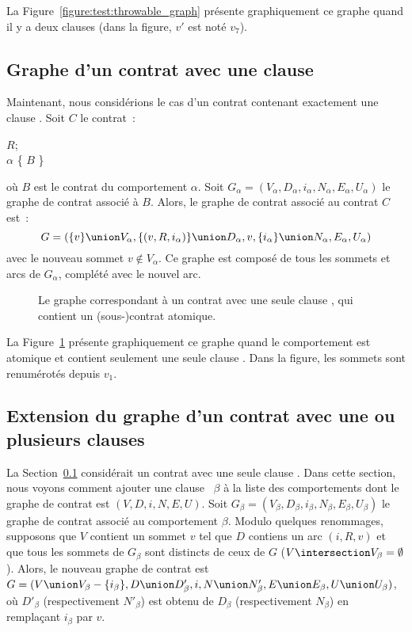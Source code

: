La Figure~\ref{figure:test:throwable_graph} présente graphiquement ce graphe
quand il y a deux clauses \athrowable (dans la figure, $v'$ est noté $v_7$).

\subsection{Graphe d'un contrat avec une clause \abehavior}
\label{subsection:test:behavior_graph}

Maintenant, nous considérions le cas d'un contrat contenant exactement une
clause \abehavior. Soit $C$ le contrat~:
%
\begin{pre}
\arequires \(R\); \\
\abehavior \(\alpha\) \{ \(B\) \}
\end{pre}
%
où $B$ est le contrat du comportement $\alpha$. Soit $G_\alpha = (V_\alpha,
D_\alpha, i_\alpha, N_\alpha, E_\alpha, U_\alpha)$ le graphe de contrat associé
à $B$. Alors, le graphe de contrat associé au contrat $C$ est~:
%
$$G = (
  \{v\} \union V_\alpha,
  \{(v, R, i_\alpha)\} \union D_\alpha,
  v,
  \{i_\alpha\} \union N_\alpha,
  E_\alpha,
  U_\alpha
)$$
%
avec le nouveau sommet $v \notin V_\alpha$. Ce graphe est composé de tous les
sommets et arcs de $G_\alpha$, complété avec le nouvel arc.

\begin{figure}


\caption{\label{figure:test:behavior_graph} Le graphe correspondant à un contrat
avec une seule clause \abehavior, qui contient un (sous-)contrat atomique.}

\end{figure}

La Figure~\ref{figure:test:behavior_graph} présente graphiquement ce graphe
quand le comportement est atomique et contient seulement une seule clause
\athrowable.  Dans la figure, les sommets sont renumérotés depuis $v_1$.

\subsection{Extension du graphe d'un contrat avec une ou plusieurs clauses
\abehavior}
\label{subsection:test:behaviors_graph}

La Section~\ref{subsection:test:behavior_graph} considérait un contrat avec une
seule clause \abehavior. Dans cette section, nous voyons comment ajouter une
clause \abehavior~$\beta$ à la liste des comportements dont le graphe de contrat
est $(V, D, i, N, E, U)$. Soit $G_\beta = (V_\beta, D_\beta, i_\beta, N_\beta,
E_\beta, U_\beta)$ le graphe de contrat associé au comportement $\beta$. Modulo
quelques renommages, supposons que $V$ contient un sommet $v$ tel que $D$
contiens un arc $(i, R, v)$ et que tous les sommets de $G_\beta$ sont distincts
de ceux de $G$ ($V \intersection V_\beta = \emptyset$). Alors, le nouveau graphe
de contrat est $G = (V \union V_\beta - \{i_\beta\}, D \union D'_\beta, i, N
\union N'_\beta, E \union E_\beta, U \union U_\beta)$, où $D'_\beta$
(respectivement $N'_\beta$) est obtenu de $D_\beta$ (respectivement $N_\beta$)
en remplaçant $i_\beta$ par $v$.

